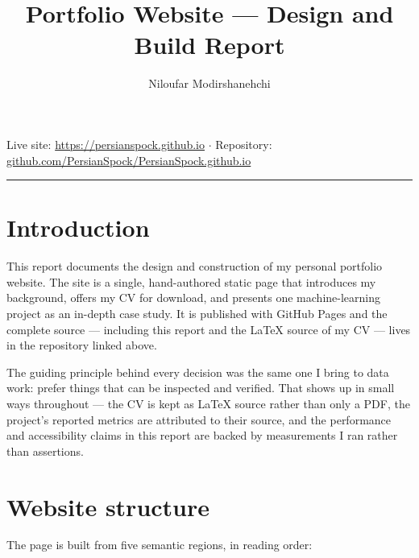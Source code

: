 \documentclass[11pt,a4paper]{article}
\title{\vspace{-1.5cm}\textbf{Portfolio Website --- Design and Build Report}}
\author{Niloufar Modirshanehchi}
\date{}
\begin{document}
\maketitle
\vspace{-1.0cm}

\begin{center}\small
Live site: \href{https://persianspock.github.io}{https://persianspock.github.io}
\quad$\cdot$\quad
Repository: \href{https://github.com/PersianSpock/PersianSpock.github.io}{github.com/PersianSpock/PersianSpock.github.io}
\end{center}
\hrule
\vspace{6pt}

\section{Introduction}

This report documents the design and construction of my personal portfolio
website. The site is a single, hand-authored static page that introduces my
background, offers my CV for download, and presents one machine-learning project
as an in-depth case study. It is published with GitHub Pages and the complete
source --- including this report and the LaTeX source of my CV --- lives in the
repository linked above.

The guiding principle behind every decision was the same one I bring to data
work: prefer things that can be inspected and verified. That shows up in small
ways throughout --- the CV is kept as LaTeX source rather than only a PDF, the
project's reported metrics are attributed to their source, and the performance
and accessibility claims in this report are backed by measurements I ran rather
than assertions.

\section{Website structure}

The page is built from five semantic regions, in reading order:
\end{document}
